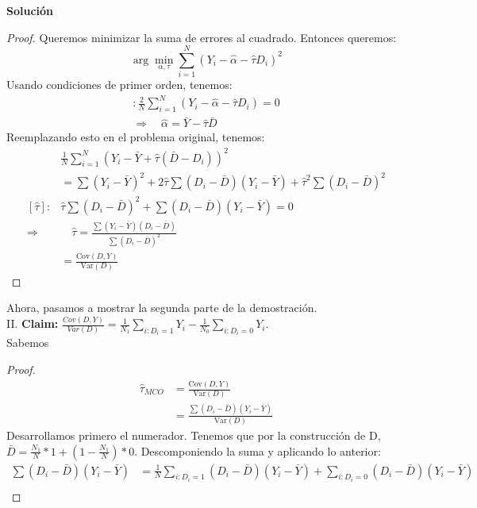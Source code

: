 \documentclass[a4paper, answers, addpoints, 11pt]{exam}
\newenvironment{solucion}{%
  \begin{mdframed}[
    backgroundcolor=blue!5,    %
    linecolor=blue!50,          %
    linewidth=2pt,              %
    leftmargin=10pt,            %
    rightmargin=10pt,           %
    topline=true,              %
    bottomline=true,            %
    roundcorner=10pt,           %
    innerleftmargin=10pt,       %
    innerrightmargin=10pt,      %
    innerbottommargin=10pt,     %
    innertopmargin=10pt         %
  ]%
  \begin{tcolorbox}[colframe=blue!50!black, colback=blue!50, coltitle=white, sharp corners=all, boxrule=1mm, width=\textwidth, halign=left, valign=center, top=0mm, bottom=0mm, left=0mm, right=0mm] \textbf{Solución} \end{tcolorbox} }{\end{mdframed}}
\begin{document}
\begin{itemize}
\begin{solucion}
\begin{proof}
Queremos minimizar la suma de errores al cuadrado. Entonces queremos:
\begin{equation*}
    \arg \min_{\alpha, \tau} \sum_{i=1}^{N} (Y_i - \hat{\alpha }- \hat{\tau} D_i)^2 
\end{equation*}
Usando condiciones de primer orden, tenemos:
    \begin{align*}
    [\hat{\alpha }]:  \frac{2}{N} \sum_{i=1}^{N} (Y_i - \hat{\alpha } - \hat{\tau} D_i) = 0\\
    \Rightarrow  \quad \hat{\alpha } = \bar{Y} - \hat{\tau}\bar{D}  
    \end{align*}
Reemplazando esto en el problema original, tenemos:
    \begin{align*}
    & \frac{1}{N} \sum_{i=1}^{N} (Y_i - \bar{Y} + \hat{\tau} (\bar{D} - D_i))^2 \\ 
    &= \sum (Y_i - \bar{Y})^2 + 2\hat{\tau} \sum (D_i - \bar{D})(Y_i - \bar{Y}) +\hat{\tau}^2 \sum (D_i - \bar{D})^2 \\  
    [\hat{\tau}]: &  \hat{\tau}\sum (D_i - \bar{D})^2 + \sum (D_i - \bar{D})(Y_i - \bar{Y}) = 0 \\  
    \Rightarrow & \quad \hat{\tau} = \frac{\sum (Y_i - \bar{Y})(D_i - \bar{D})}{\sum (D_i - \bar{D})^2} \\  
    &= \frac{\text{Cov}(D, Y)}{\text{Var}(D)} 
\end{align*}
\end{proof}
    Ahora, pasamos a mostrar la segunda parte de la demostración.\\
     II.  \textbf{Claim:} $\frac{Cov(D, Y)}{Var(D)}= \frac{1}{N_1}\sum_{{i : D_i = 1}} Y_i - \frac{1}{N_0}\sum_{{i : D_i = 0}} Y_i $.\\
     Sabemos
     \begin{proof}
      \begin{align*}
    \hat{\tau}_{MCO} &= \frac{\text{Cov}(D, Y)}{\text{Var}(D)} \\
    &=\frac{\sum (D_i - \bar{D})(Y_i - \bar{Y})}{\text{Var}(D)} 
    \end{align*}
    Desarrollamos primero el numerador. Tenemos que por la construcción de D,  $\bar{D}=\frac{N_1}{N}*1+ (1 - \frac{N_1}{N})*0 $. Descomponiendo la suma y aplicando lo anterior:
    \begin{align*}
\sum (D_i - \bar{D})(Y_i - \bar{Y})
    &= \frac{1}{N} \sum_{i:D_i=1} (D_i - \bar{D})(Y_i - \bar{Y}) + \sum_{i:D_i=0} (D_i - \bar{D})(Y_i - \bar{Y}) \\  

\end{align*}
\end{proof}
\end{solucion}
\end{itemize}
\end{document}
